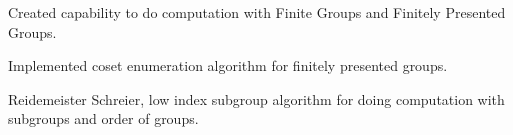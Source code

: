 \documentclass[]{deedy-resume-openfont}
\begin{document}
\begin{minipage}[t]{0.66\textwidth}
\vspace{\topsep} %
\begin{tightemize}
\item Created capability to do computation with Finite Groups and Finitely Presented Groups.
\item Implemented coset enumeration algorithm for finitely presented groups.
\item Reidemeister Schreier, low index subgroup algorithm for doing computation with subgroups and order of groups.
\end{tightemize}
\sectionsep





\end{minipage}
\end{document}
